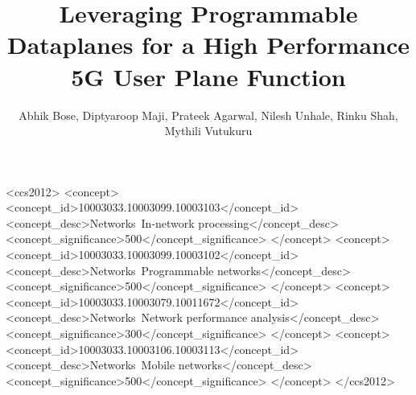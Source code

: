 \documentclass[sigconf,10pt]{acmart}
\begin{document}
\title[Leveraging Programmable Dataplanes for a High Performance 5G UPF]{Leveraging Programmable Dataplanes for a High Performance 5G User Plane Function}


\author{Abhik Bose\footnotemark[1], Diptyaroop Maji\footnotemark[1], Prateek Agarwal, Nilesh Unhale, Rinku Shah, Mythili Vutukuru}

% 

\renewcommand{\shortauthors}{Abhik Bose, et al.}


\begin{abstract}
   
\end{abstract}

\begin{CCSXML}
<ccs2012>
   <concept>
       <concept_id>10003033.10003099.10003103</concept_id>
       <concept_desc>Networks~In-network processing</concept_desc>
       <concept_significance>500</concept_significance>
       </concept>
   <concept>
       <concept_id>10003033.10003099.10003102</concept_id>
       <concept_desc>Networks~Programmable networks</concept_desc>
       <concept_significance>500</concept_significance>
       </concept>
   <concept>
       <concept_id>10003033.10003079.10011672</concept_id>
       <concept_desc>Networks~Network performance analysis</concept_desc>
       <concept_significance>300</concept_significance>
       </concept>
   <concept>
       <concept_id>10003033.10003106.10003113</concept_id>
       <concept_desc>Networks~Mobile networks</concept_desc>
       <concept_significance>500</concept_significance>
       </concept>
 </ccs2012>
\end{CCSXML}
\end{document}
